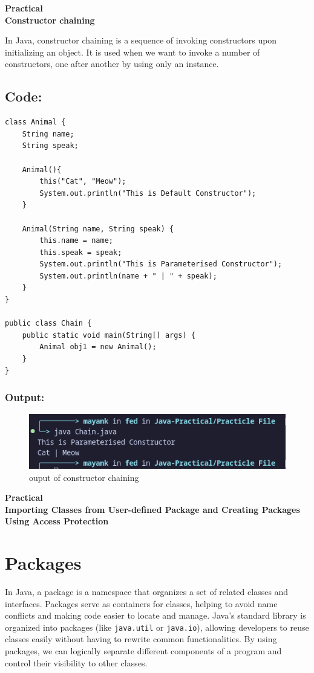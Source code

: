 \documentclass[a4paper,12pt]{article}
\newcounter{practicalno} %
\newcommand{\practicaltitle}[1]{
    \stepcounter{practicalno} %
    \newpage
    \begin{center}
        \vspace{1cm}
        \Large\textbf{Practical \thepracticalno} \\
        \vspace{0.5cm}
        \Large\textbf{#1} %
        \normalsize\vspace{1cm}
    \end{center}
}
\begin{document}
\setcounter{section}{0}

\practicaltitle{Constructor chaining}
In Java, constructor chaining is a sequence of invoking constructors upon initializing an object. It is used when we want to invoke a number of constructors, one after another by using only an instance.

\subsection{Code: }
\begin{lstlisting}
class Animal {
    String name;
    String speak;

    Animal(){
        this("Cat", "Meow");
        System.out.println("This is Default Constructor");
    }

    Animal(String name, String speak) {
        this.name = name;
        this.speak = speak;
        System.out.println("This is Parameterised Constructor");
        System.out.println(name + " | " + speak);
    }
}

public class Chain {
    public static void main(String[] args) {
        Animal obj1 = new Animal();
    }
}
\end{lstlisting}
\subsubsection{Output: }
\begin{figure}[H]
    \centering
    \includegraphics[width=0.9\linewidth]{images/Chain.png}
    \caption{ouput of constructor chaining}
    \label{fig:sample_image}
\end{figure}

\setcounter{section}{0}
\practicaltitle{Importing Classes from User-defined Package and Creating Packages Using Access Protection}

\section{Packages}
In Java, a package is a namespace that organizes a set of related classes and interfaces. Packages serve as containers for classes, helping to avoid name conflicts and making code easier to locate and manage. Java’s standard library is organized into packages (like \texttt{java.util} or \texttt{java.io}), allowing developers to reuse classes easily without having to rewrite common functionalities. By using packages, we can logically separate different components of a program and control their visibility to other classes.
\end{document}
